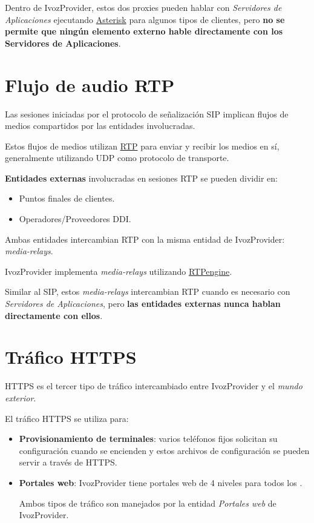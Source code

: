 \documentclass[letterpaper,10pt,spanish]{sphinxmanual}
\begin{document}
Dentro de IvozProvider, estos dos proxies pueden hablar con \emph{Servidores de Aplicaciones} ejecutando \href{http://www.asterisk.org/}{Asterisk} para algunos tipos de clientes, pero \textbf{no se permite que ningún elemento externo hable directamente con los Servidores de Aplicaciones}.


\section{Flujo de audio RTP}
\label{basic_concepts/architecture/index:rtp-audio-flow}\label{basic_concepts/architecture/index:audioflow}
Las sesiones iniciadas por el protocolo de señalización SIP implican flujos de medios compartidos por las entidades involucradas.

Estos flujos de medios utilizan \href{https://tools.ietf.org/html/rfc3550}{RTP} para enviar y recibir los medios en sí, generalmente utilizando UDP como protocolo de transporte.

\textbf{Entidades externas} involucradas en sesiones RTP se pueden dividir en:
\begin{itemize}
\item {} 
Puntos finales de clientes.

\item {} 
Operadores/Proveedores DDI.

\end{itemize}

Ambas entidades intercambian RTP con la misma entidad de IvozProvider: \emph{media-relays}.

IvozProvider implementa \emph{media-relays} utilizando \href{https://github.com/sipwise/rtpengine}{RTPengine}.

Similar al SIP, estos \emph{media-relays} intercambian RTP cuando es necesario con \emph{Servidores de Aplicaciones}, pero \textbf{las entidades externas nunca hablan directamente con ellos}.


\section{Tráfico HTTPS}
\label{basic_concepts/architecture/index:https-traffic}
HTTPS es el tercer tipo de tráfico intercambiado entre IvozProvider y el \emph{mundo exterior}.

El tráfico HTTPS se utiliza para:
\begin{itemize}
\item {} 
\textbf{Provisionamiento de terminales}: varios teléfonos fijos solicitan su configuración cuando se encienden y estos archivos de configuración se pueden servir a través de HTTPS.

\item {} 
\textbf{Portales web}: IvozProvider tiene portales web de 4 niveles para todos los {\hyperref[basic_concepts/operation_roles/index:operation\string-roles]{}}.

Ambos tipos de tráfico son manejados por la entidad \emph{Portales web} de IvozProvider.

\end{itemize}
\end{document}
